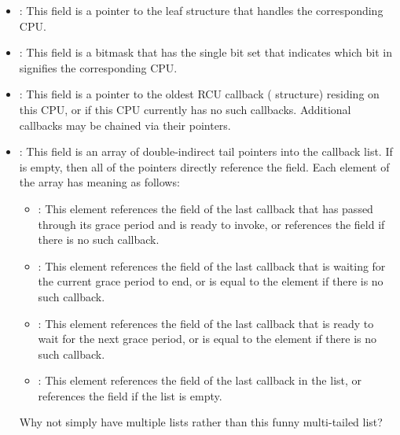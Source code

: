 \begin{itemize}
\item	{}:
	This field is a pointer to the leaf  structure that
	handles the corresponding CPU.
\item	{}:
	This field is a bitmask that has the single bit set that indicates
	which bit in  signifies the corresponding CPU.
\item	{}:
	This field is a pointer to the oldest RCU callback (
	structure) residing on this CPU, or  if this CPU currently
	has no such callbacks.
	Additional callbacks may be chained via their  pointers.
\item	{}:
	This field is an array of double-indirect tail pointers
	into the  callback list.
	If  is empty, then all of the  pointers
	directly reference the  field.
	Each element of the  array has meaning as follows:
	\begin{itemize}
	\item	{}:
		This element references the  field of
		the last callback that has passed through its grace
		period and is ready to invoke, or references the 
		field if there is no such callback.
	\item	{}:
		This element references the  field of the
		last callback that is waiting for the current grace
		period to end, or is equal to the 
		element if there is no such callback.
	\item	{}:
		This element references the  field of the
		last callback that is ready to wait for the next
		grace period, or is equal to the 
		element if there is no such callback.
	\item	{}:
		This element references the  field of the
		last callback in the list, or references the 
		field if the list is empty.
	\end{itemize}

\QuickQuiz{}
	Why not simply have multiple lists rather than this funny
	multi-tailed list?
 \QuickQuizEnd


\end{itemize}
